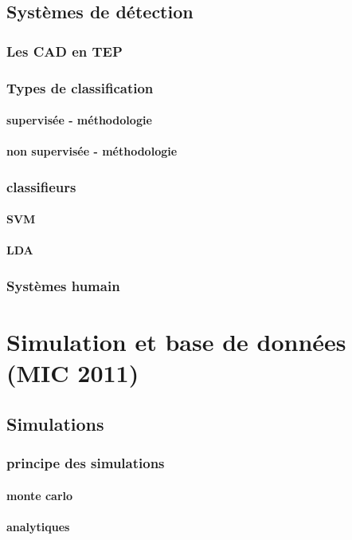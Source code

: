 \documentclass[12pt]{book}
\begin{document}
	\chapter{Systèmes de détection}
		\section{Les CAD en TEP}
		\section{Types de classification}
			\subsection{supervisée - méthodologie}
			\subsection{non supervisée - méthodologie}
		\section{classifieurs}
			\subsection{SVM}
			\subsection{LDA}
		\section{Systèmes humain}


\part{Simulation et base de données (MIC 2011)}
	\chapter{Simulations}
		\section{principe des simulations}
			\subsection{monte carlo}
			\subsection{analytiques}
\end{document}
